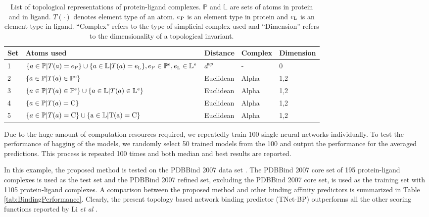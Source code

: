 \documentclass[10pt]{article}
\newcommand\BindPCCMedian{0.826}
\newcommand\BindRMSEMedian{1.37}
\begin{document}
\begin{table}[ht]
\caption{List of topological representations of protein-ligand complexes.  $\mathbb{P}$ and $\mathbb{L}$ are sets of atoms in protein and in ligand. $T(\cdot)$ denotes element type of an atom. $e_{\rm{P}}$ is an element type in protein and $e_{\rm{L}}$ is an element type in ligand.   
``Complex'' refers to the type of simplicial complex used and ``Dimension''  refers to the dimensionality of a topological invariant.}
\label{tab:BindingRepresentation}
\centering
\begin{tabular}{|l|l|l|l|l|}
\hline
 Set & Atoms used & Distance & Complex & Dimension \\
\hline
1 & $\{a\in \mathbb{P}|T(a)=e_{\rm{P}}\}\cup\{a\in \mathbb{L}|T(a)=e_{\rm{L}}\}, e_{\rm{P}}\in\mathbb{P}^{\rm{e}}, e_{\rm{L}}\in\mathbb{L}^{\rm{e}}$& $d^{op}$ & - & 0 \\
\hline
2 & $\{a\in\mathbb{P}|T(a)\in\mathbb{P}^{\rm{e}}\}$ & Euclidean & Alpha & 1,2 \\
\hline
3 & $\{a\in\mathbb{P}|T(a)\in\mathbb{P}^{\rm{e}}\}\cup\{a\in\mathbb{L}|T(a)\in\mathbb{L}^{\rm{e}}\}$ & Euclidean & Alpha & 1,2 \\
\hline
4 & $\{a\in\mathbb{P}|T(a)=\rm{C}\}$ & Euclidean & Alpha & 1,2 \\
\hline
5 & $\{a\in\mathbb{P}|T(a)=\rm{C}\}\cup\{a\in\mathbb{L}|T(a)=\rm{C}\}$ & Euclidean & Alpha & 1,2 \\
\hline
\end{tabular}
\end{table}

Due to the huge amount of computation resources required, we repeatedly train 100 single neural networks individually. To test the performance of bagging of the models, we randomly select 50 trained models from the 100 and output the performance for the averaged predictions. This process is repeated 100 times and both median and best results are reported.

In this example, the proposed method is tested on the PDBBind 2007 data set \cite{PDBBind:2015}. The  PDBBind 2007 core set of 195 protein-ligand complexes  is used as the test set and  the PDBBind 2007 refined set, excluding the  PDBBind 2007 core set, is used as the training set with 1105 protein-ligand complexes. A comparison between the proposed method and other binding affinity predictors is summarized in Table \ref{tab:BindingPerformance}. Clearly, the present topology based network binding predictor (TNet-BP) outperforms all the other scoring functions reported by  Li \emph{et al} \cite{HLi:2015}.  %
\end{document}
